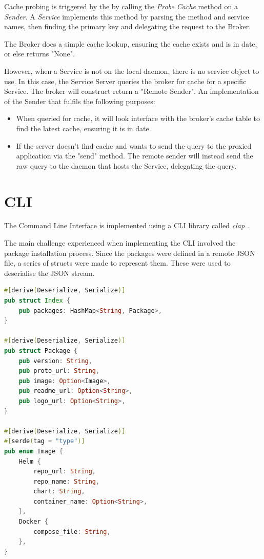 \documentclass[a4paper,12pt]{report}
\begin{document}
Cache probing is triggered by the  by calling the \textit{Probe Cache} method on a \textit{Sender}.
A \textit{Service} implements this method by parsing the method and service names, then finding the primary key and delegating the request to the Broker.

The Broker does a simple cache lookup, ensuring the cache exists and is in date, or else returns "None".

However, when a Service is not on the local daemon, there is no service object to use. In this case, the Service Server queries the broker for cache for a specific Service. The broker will construct return a "Remote Sender". An implementation of the Sender that fulfils the following purposes:

\begin{itemize}
    \item When queried for cache, it will look interface with the broker's cache table to find the latest cache, ensuring it is in date.
    \item If the server doesn't find cache and wants to send the query to the proxied application via the "send" method. The remote sender will instead send the raw query to the daemon that hosts the Service, delegating the query.
\end{itemize}

\section{CLI}
The Command Line Interface is implemented using a CLI library called \textit{clap \cite{clap}}.

The main challenge experienced when implementing the CLI involved the package installation process.
Since the packages were defined in a remote JSON file, a series of structs were made to represent them. These were used to deserialise the JSON stream.

\begin{lstlisting}[language=Rust]
#[derive(Deserialize, Serialize)]
pub struct Index {
    pub packages: HashMap<String, Package>,
}

#[derive(Deserialize, Serialize)]
pub struct Package {
    pub version: String,
    pub proto_url: String,
    pub image: Option<Image>,
    pub readme_url: Option<String>,
    pub logo_url: Option<String>,
}

#[derive(Deserialize, Serialize)]
#[serde(tag = "type")]
pub enum Image {
    Helm {
        repo_url: String,
        repo_name: String,
        chart: String,
        container_name: Option<String>,
    },
    Docker {
        compose_file: String,
    },
}
\end{lstlisting}
\end{document}
